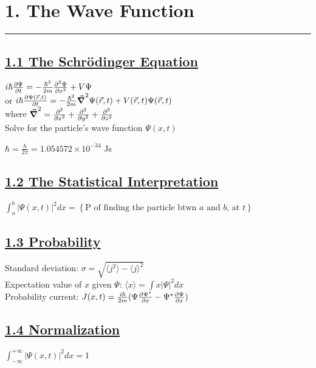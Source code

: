 \section{1. The Wave Function} \hrule height 0.3pt \thinspace

\subsection{\underline{1.1 The Schr\"{o}dinger Equation}}

$i \hbar \pdv{\Psi}{t} = - \frac{\hbar^2}{2m} \pdv[2]{\Psi}{x} + V \Psi$ \\ or
$i \hbar \pdv{\Psi(\vec{r}, t)}{t} = -\frac{\hbar^2}{2m} \vec{\grad}^2 \Psi(\vec{r}, t) + V(\vec{r}, t) \Psi(\vec{r}, t)$ \\
where $\vec{\grad}^2 = \pdv[2]{}{x} + \pdv[2]{}{y} + \pdv[3]{}{z}$ \\

Solve for the particle's wave function $\Psi(x, t)$

$\hbar = \frac{h}{2\pi} = 1.054572 \times 10^{-34}$ Js \\

\subsection{\underline{1.2 The Statistical Interpretation}}

$\int_{a}^{b} |\Psi(x, t)|^2 dx = \left\{ \textrm{P of finding the particle btwn $a$ and $b$, at $t$} \right\}$ \\

\subsection{\underline{1.3 Probability}}
Standard deviation: $\sigma = \sqrt{\langle j^2 \rangle - \langle j \rangle ^2}$ \\
Expectation value of $x$ given $\Psi$: $\langle x \rangle = \int x |\Psi|^2 dx$ \\
Probability current: $J(x, t)=\frac{i \hbar}{2m} (\Psi \pdv{\Psi^*}{x} - \Psi^* \pdv{\Psi}{x})$

\subsection{\underline{1.4 Normalization}}

$\int_{-\infty}^{+\infty} |\Psi (x, t)|^2 dx = 1$ \\

